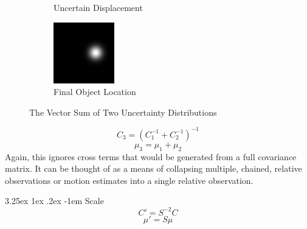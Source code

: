 \documentclass[a4paper, 11pt, titlepage]{article}
\makeatletter
\renewcommand\paragraph{\@startsection{paragraph}{5}{\z@}%
  {3.25ex \@plus1ex \@minus.2ex}%
  {-1em}%
  {\normalfont\normalsize\bfseries}}
\makeatother
\begin{document}
\begin{figure}
\begin{subfigure}{.33\textwidth}
          \caption{Uncertain Displacement}
          \label{fig:vectSumsub2}
        \end{subfigure}
        \begin{subfigure}{.33\textwidth}
          \centering
          \includegraphics[width=.9\linewidth]{images/GaussianSum3.png}
          \caption{Final Object Location}
          \label{fig:vectSumsub3}
        \end{subfigure}
        \caption{The Vector Sum of Two Uncertainty Distributions}
        \label{fig:vectSum}
        \end{figure}
        \begin{equation}
        C_3 = (C_1^{-1} + C_2^{-1})^{-1}
        \end{equation}
        \begin{equation}
        \mu_3 = \mu_1 + \mu_2
        \end{equation}
        Again, this ignores cross terms that would be generated from a full covariance matrix.  It can be thought of as a means of collapsing multiple, chained, relative observations or motion estimates into a single relative observation.

        \paragraph{Scale}
        \begin{equation}
        C' = S^{-2} C
        \end{equation}
        \begin{equation}
        \mu' = S \mu
        \end{equation}
\end{document}
